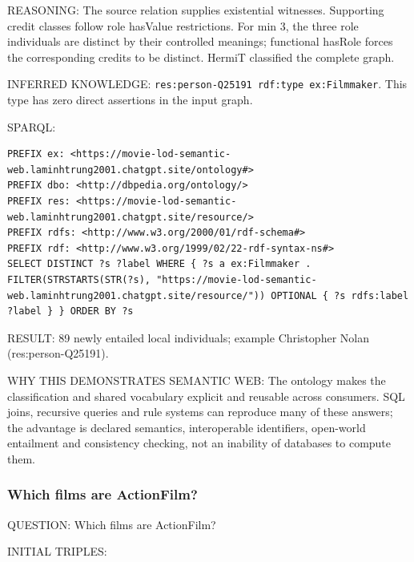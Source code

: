\documentclass[
  11pt,
]{article}
\begin{document}
REASONING: The source relation supplies existential witnesses.
Supporting credit classes follow role hasValue
restrict\allowbreak{}ions.\allowbreak{} For min 3, the three role
individuals are distinct by their controlled meanings; functional
hasRole forces the correspo\allowbreak{}nding credits to be distinct.
HermiT classified the complete graph.

INFERRED KNOWLEDGE:
\texttt{res:\allowbreak{}pers\allowbreak{}on-\allowbreak{}\allowbreak{}Q2519\allowbreak{}1 rdf:\allowbreak{}ty\allowbreak{}pe ex:\allowbreak{}\allowbreak{}Fi\allowbreak{}lmmaker}.
This type has zero direct assertions in the input graph.

SPARQL:

\begin{verbatim}
PREFIX ex: <https://movie-lod-semantic-web.laminhtrung2001.chatgpt.site/ontology#>
PREFIX dbo: <http://dbpedia.org/ontology/>
PREFIX res: <https://movie-lod-semantic-web.laminhtrung2001.chatgpt.site/resource/>
PREFIX rdfs: <http://www.w3.org/2000/01/rdf-schema#>
PREFIX rdf: <http://www.w3.org/1999/02/22-rdf-syntax-ns#>
SELECT DISTINCT ?s ?label WHERE { ?s a ex:Filmmaker . FILTER(STRSTARTS(STR(?s), "https://movie-lod-semantic-web.laminhtrung2001.chatgpt.site/resource/")) OPTIONAL { ?s rdfs:label ?label } } ORDER BY ?s
\end{verbatim}

RESULT: 89 newly entailed local individuals; example Christopher Nolan
(res:\allowbreak{}per\allowbreak{}son-\allowbreak{}\allowbreak{}Q251\allowbreak{}91).\allowbreak{}

WHY THIS DEMONSTRATES SEMANTIC WEB: The ontology makes the
classifi\allowbreak{}cation and shared vocabulary explicit and reusable
across consumers. SQL joins, recursive queries and rule systems can
reproduce many of these answers; the advantage is declared semantics,
interope\allowbreak{}rable identifiers, open-world entailment and
consistency checking, not an inability of databases to compute them.

\subsubsection{Which films are
ActionFilm?}\label{which-films-are-actionfilm}

QUESTION: Which films are ActionFilm?

INITIAL TRIPLES:
\end{document}
